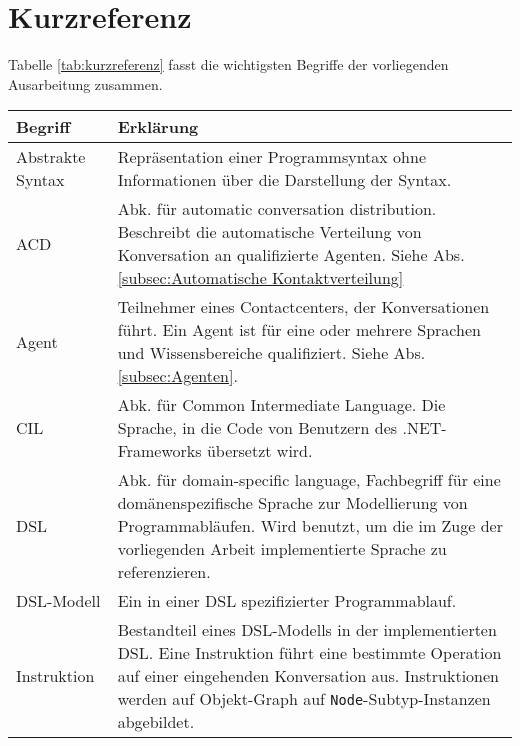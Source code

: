 \section{Kurzreferenz}
\label{sec:Kurzreferenz}
Tabelle \ref{tab:kurzreferenz} fasst die wichtigsten Begriffe der vorliegenden Ausarbeitung zusammen.

\begin{table}[hbtp]
\centering
\settowidth{}
\begin{tabulary}{1.0\textwidth}{L|L}
\textbf{Begriff} & \textbf{Erklärung} \\
\hline
Abstrakte Syntax & Repräsentation einer Programmsyntax ohne Informationen über die Darstellung der Syntax.\\

\hline

ACD & Abk. für automatic conversation distribution. Beschreibt die automatische Verteilung von Konversation an qualifizierte Agenten. Siehe Abs. \ref{subsec:Automatische Kontaktverteilung} \\

\hline

Agent & Teilnehmer eines Contactcenters, der Konversationen führt. Ein Agent ist für eine oder mehrere Sprachen und Wissensbereiche qualifiziert. Siehe Abs. \ref{subsec:Agenten}. \\

\hline

CIL & Abk. für Common Intermediate Language. Die Sprache, in die Code von Benutzern des .NET-Frameworks übersetzt wird. \\

\hline

DSL & Abk. für domain-specific language, Fachbegriff für eine domänenspezifische Sprache zur Modellierung von Programmabläufen. Wird benutzt, um die im Zuge der vorliegenden Arbeit implementierte Sprache zu referenzieren.\\

\hline

DSL-Modell & Ein in einer DSL spezifizierter Programmablauf.\\

\hline

Instruktion & Bestandteil eines DSL-Modells in der implementierten DSL. Eine Instruktion führt eine bestimmte Operation auf einer eingehenden Konversation aus. Instruktionen werden auf Objekt-Graph auf \texttt{Node}-Subtyp-Instanzen abgebildet. \\


\end{tabulary}
\end{table}
